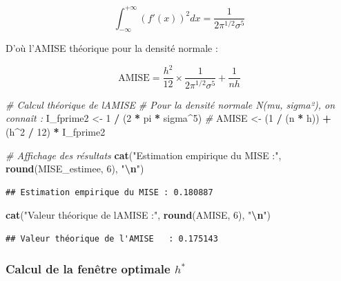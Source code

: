 \documentclass[
  12pt,
]{article}
\newenvironment{Shaded}{\begin{snugshade}}{\end{snugshade}}
\newcommand{\CommentTok}[1]{\textcolor[rgb]{0.56,0.35,0.01}{\textit{#1}}}
\newcommand{\DecValTok}[1]{\textcolor[rgb]{0.00,0.00,0.81}{#1}}
\newcommand{\FunctionTok}[1]{\textcolor[rgb]{0.13,0.29,0.53}{\textbf{#1}}}
\newcommand{\NormalTok}[1]{#1}
\newcommand{\OtherTok}[1]{\textcolor[rgb]{0.56,0.35,0.01}{#1}}
\newcommand{\SpecialCharTok}[1]{\textcolor[rgb]{0.81,0.36,0.00}{\textbf{#1}}}
\newcommand{\StringTok}[1]{\textcolor[rgb]{0.31,0.60,0.02}{#1}}
\begin{document}
\[
\int_{-\infty}^{+\infty} (f'(x))^2 dx = \frac{1}{2\pi^{1/2}\sigma^5}
\]

D'où l'AMISE théorique pour la densité normale :

\[
\text{AMISE} = \frac{h^2}{12} \times \frac{1}{2\pi^{1/2}\sigma^5} + \frac{1}{nh}
\]

\begin{Shaded}
\begin{Highlighting}[]
\CommentTok{\# Calcul théorique de l\textquotesingle{}AMISE}
\CommentTok{\# Pour la densité normale N(mu, sigma²), on connaît :}
\NormalTok{I\_fprime2 }\OtherTok{\textless{}{-}} \DecValTok{1} \SpecialCharTok{/}\NormalTok{ (}\DecValTok{2} \SpecialCharTok{*}\NormalTok{ pi }\SpecialCharTok{*}\NormalTok{ sigma}\SpecialCharTok{\^{}}\DecValTok{5}\NormalTok{)  }\CommentTok{\# }
\NormalTok{AMISE }\OtherTok{\textless{}{-}}\NormalTok{ (}\DecValTok{1} \SpecialCharTok{/}\NormalTok{ (n }\SpecialCharTok{*}\NormalTok{ h)) }\SpecialCharTok{+}\NormalTok{ (h}\SpecialCharTok{\^{}}\DecValTok{2} \SpecialCharTok{/} \DecValTok{12}\NormalTok{) }\SpecialCharTok{*}\NormalTok{ I\_fprime2}

\CommentTok{\# Affichage des résultats}
\FunctionTok{cat}\NormalTok{(}\StringTok{"Estimation empirique du MISE :"}\NormalTok{, }\FunctionTok{round}\NormalTok{(MISE\_estimee, }\DecValTok{6}\NormalTok{), }\StringTok{"}\SpecialCharTok{\textbackslash{}n}\StringTok{"}\NormalTok{)}
\end{Highlighting}
\end{Shaded}

\begin{verbatim}
## Estimation empirique du MISE : 0.180887
\end{verbatim}

\begin{Shaded}
\begin{Highlighting}[]
\FunctionTok{cat}\NormalTok{(}\StringTok{"Valeur théorique de l\textquotesingle{}AMISE   :"}\NormalTok{, }\FunctionTok{round}\NormalTok{(AMISE, }\DecValTok{6}\NormalTok{), }\StringTok{"}\SpecialCharTok{\textbackslash{}n}\StringTok{"}\NormalTok{)}
\end{Highlighting}
\end{Shaded}

\begin{verbatim}
## Valeur théorique de l'AMISE   : 0.175143
\end{verbatim}

\subsubsection{\texorpdfstring{Calcul de la fenêtre optimale
\(h^*\)}{Calcul de la fenêtre optimale h\^{}*}}\label{calcul-de-la-fenuxeatre-optimale-h}
\end{document}
